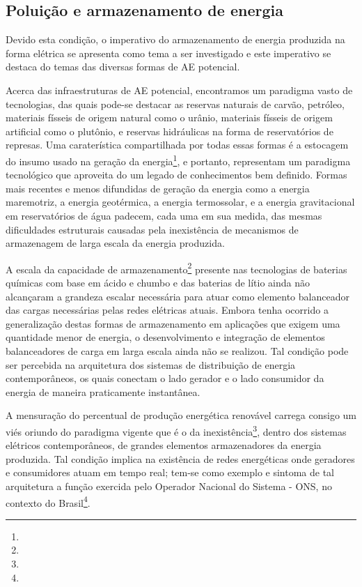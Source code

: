 \subsection{Poluição e armazenamento de energia}

Devido esta condição, o imperativo do  armazenamento de energia produzida na forma elétrica se apresenta como tema a ser investigado e este imperativo se destaca do temas das diversas formas de AE potencial. 

Acerca das infraestruturas de AE potencial, encontramos um paradigma vasto de tecnologias, das quais pode-se destacar as reservas naturais de carvão, petróleo, materiais físseis de origem natural como o urânio, materiais físseis de origem artificial como o plutônio, e reservas hidráulicas na forma de reservatórios de represas. Uma caraterística compartilhada por todas essas formas é a estocagem do insumo usado na geração da energia\footnote{}, e portanto, representam um paradigma tecnológico que aproveita do um legado de conhecimentos bem definido. Formas mais recentes e menos difundidas de geração da energia como a energia maremotriz, a energia geotérmica, a energia termossolar, e a energia gravitacional em reservatórios de água padecem, cada uma em sua medida, das mesmas dificuldades estruturais causadas pela inexistência de mecanismos de armazenagem de larga escala da energia produzida.

A escala da capacidade de armazenamento\footnote{} presente nas tecnologias de baterias químicas com base em ácido e chumbo e das baterias de lítio ainda não alcançaram a grandeza escalar necessária para atuar como elemento balanceador das cargas necessárias pelas redes elétricas atuais. Embora tenha ocorrido a generalização destas formas de armazenamento em aplicações que exigem uma quantidade menor de energia, o desenvolvimento e integração de elementos balanceadores de carga em larga escala ainda não se realizou. Tal condição pode ser percebida na arquitetura dos sistemas de distribuição de energia contemporâneos, os quais conectam o lado gerador e o lado consumidor da energia de maneira praticamente instantânea.

A mensuração do percentual de produção energética renovável carrega consigo um viés oriundo do paradigma vigente que é o da inexistência\footnote{}, dentro dos sistemas elétricos contemporâneos, de grandes elementos armazenadores da energia produzida. Tal condição implica na existência de redes energéticas onde geradores e consumidores atuam em tempo real; tem-se como exemplo e sintoma de tal arquitetura a função exercida pelo Operador Nacional do Sistema - ONS, no contexto do Brasil\footnote{}.

